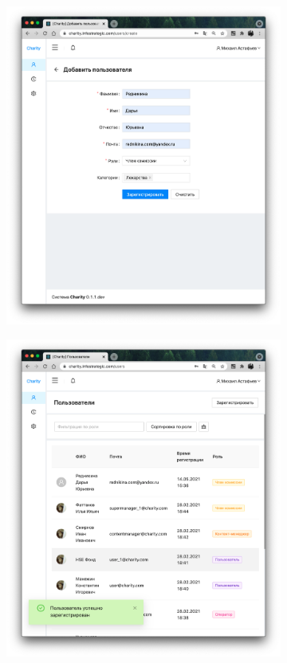 \documentclass[a4paper,12pt,reqno]{article}
\begin{document}
	\begin{figure}[H]
		\centering
		\begin{subfigure}[b]{0.475\linewidth}
			\includegraphics[width=\linewidth]{img/ro/reg_filled.png}
		\end{subfigure}
		\begin{subfigure}[b]{0.475\linewidth}
			\includegraphics[width=\linewidth]{img/ro/reg_success.png}

\end{subfigure}
\end{figure}
\end{document}
